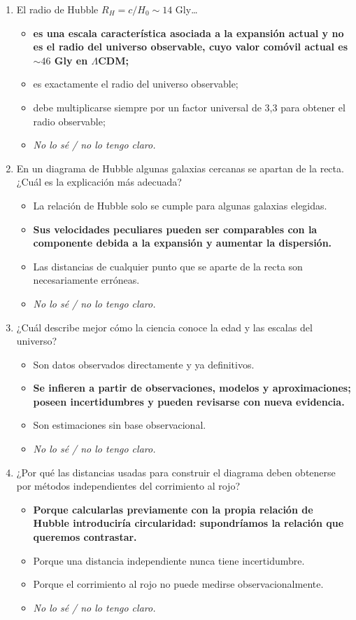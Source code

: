 \begin{enumerate}[leftmargin=*]
\item El radio de Hubble $R_H=c/H_0\sim14$ Gly\ldots
\begin{itemize}
\item \textbf{es una escala característica asociada a la expansión actual y no es el radio del universo observable, cuyo valor comóvil actual es $\sim46$ Gly en $\Lambda$CDM;}
\item es exactamente el radio del universo observable;
\item debe multiplicarse siempre por un factor universal de 3,3 para obtener el radio observable;
\item \textit{No lo sé / no lo tengo claro.}
\end{itemize}

\item En un diagrama de Hubble algunas galaxias cercanas se apartan de la recta. ¿Cuál es la explicación más adecuada?
\begin{itemize}
\item La relación de Hubble solo se cumple para algunas galaxias elegidas.
\item \textbf{Sus velocidades peculiares pueden ser comparables con la componente debida a la expansión y aumentar la dispersión.}
\item Las distancias de cualquier punto que se aparte de la recta son necesariamente erróneas.
\item \textit{No lo sé / no lo tengo claro.}
\end{itemize}

\item ¿Cuál describe mejor cómo la ciencia conoce la edad y las escalas del universo?
\begin{itemize}
\item Son datos observados directamente y ya definitivos.
\item \textbf{Se infieren a partir de observaciones, modelos y aproximaciones; poseen incertidumbres y pueden revisarse con nueva evidencia.}
\item Son estimaciones sin base observacional.
\item \textit{No lo sé / no lo tengo claro.}
\end{itemize}

\item ¿Por qué las distancias usadas para construir el diagrama deben obtenerse por métodos independientes del corrimiento al rojo?
\begin{itemize}
\item \textbf{Porque calcularlas previamente con la propia relación de Hubble introduciría circularidad: supondríamos la relación que queremos contrastar.}
\item Porque una distancia independiente nunca tiene incertidumbre.
\item Porque el corrimiento al rojo no puede medirse observacionalmente.
\item \textit{No lo sé / no lo tengo claro.}
\end{itemize}
\end{enumerate}

